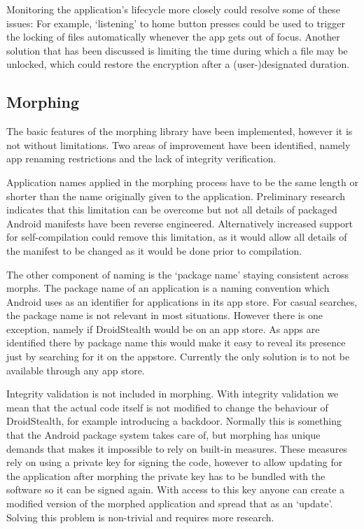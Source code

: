Monitoring the application's lifecycle more closely could resolve some of these issues:
For example, `listening' to home button presses could be used to trigger the locking of files automatically whenever the app gets out of focus.
Another solution that has been discussed is limiting the time during which a file may be unlocked, which could restore the encryption after a (user-)designated duration.

\subsection{Morphing} 
\label{sec:limitations:morphing}

The basic features of the morphing library have been implemented, however it is not without limitations.
Two areas of improvement have been identified, namely app renaming restrictions and the lack of integrity verification.

Application names applied in the morphing process have to be the same length or shorter than the name originally given to the application.
Preliminary research indicates that this limitation can be overcome but not all details of packaged Android manifests have been reverse engineered.
Alternatively increased support for self-compilation could remove this limitation, as it would allow all details of the manifest to be changed as it would be done prior to compilation.

The other component of naming is the `package name' staying consistent across morphs. 
The package name of an application is a naming convention which Android uses as an identifier for applications in its app store.
For casual searches, the package name is not relevant in most situations.
However there is one exception, namely if DroidStealth would be on an app store. 
As apps are identified there by package name this would make it easy to reveal its presence just by searching for it on the appstore.
Currently the only solution is to not be available through any app store.

Integrity validation is not included in morphing.
With integrity validation we mean that the actual code itself is not modified to change the behaviour of DroidStealth, for example introducing a backdoor.
Normally this is something that the Android package system takes care of, but morphing has unique demands that makes it impossible to rely on built-in measures.
These measures rely on using a private key for signing the code, however to allow updating for the application after morphing the private key has to be bundled with the software so it can be signed again.
With access to this key anyone can create a modified version of the morphed application and spread that as an `update'.
Solving this problem is non-trivial and requires more research.

